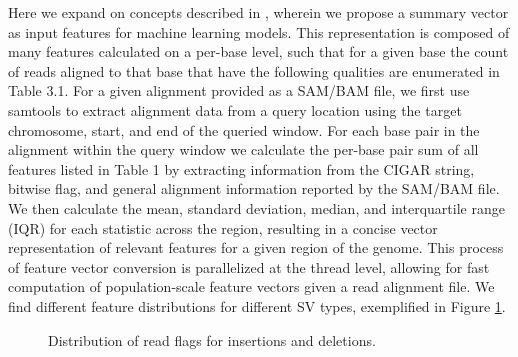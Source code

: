 Here we expand on concepts described in \cite{hillDeepLearningApproach2019}, wherein we propose a summary vector as input features for machine learning models. This representation is composed of many features calculated on a per-base level, such that for a given base the count of reads aligned to that base that have the following qualities are enumerated in Table 3.1. For a given alignment provided as a SAM/BAM file, we first use samtools \cite{danecekTwelveYearsSAMtools2021} to extract alignment data from a query location using the target chromosome, start, and end of the queried window. For each base pair in the alignment within the query window we calculate the per-base pair sum of all features listed in Table 1 by extracting information from the CIGAR string, bitwise flag, and general alignment information reported by the SAM/BAM file. We then calculate the mean, standard deviation, median, and interquartile range (IQR) for each statistic across the region, resulting in a concise vector representation of relevant features for a given region of the genome. This process of feature vector conversion is parallelized at the thread level, allowing for fast computation of population-scale feature vectors given a read alignment file. We find different feature distributions for different SV types, exemplified in Figure \ref{fig:read-dists}.

\begin{figure}
    \centering
    \caption[Distribution of read flags per structural variant type.]{Distribution of read flags for insertions and deletions.}
    \label{fig:read-dists}
\end{figure}

